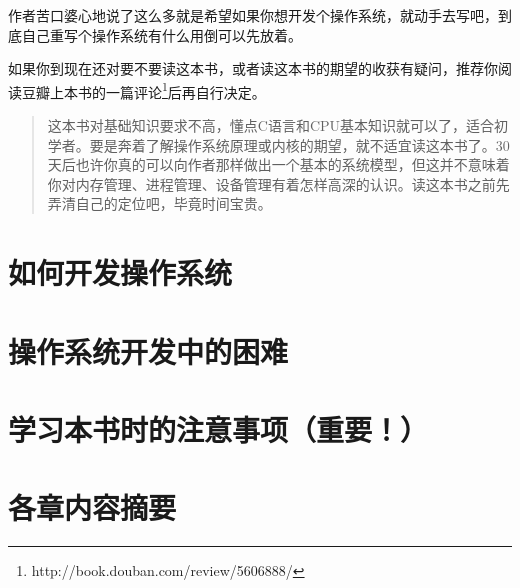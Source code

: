 作者苦口婆心地说了这么多就是希望如果你想开发个操作系统，就动手去写吧，到底自己重写个操作系统有什么用倒可以先放着。

如果你到现在还对要不要读这本书，或者读这本书的期望的收获有疑问，推荐你阅读豆瓣上本书的一篇评论\footnote{ http://book.douban.com/review/5606888/ }后再自行决定。
\begin{quote}
这本书对基础知识要求不高，懂点C语言和CPU基本知识就可以了，适合初学者。要是奔着了解操作系统原理或内核的期望，就不适宜读这本书了。30天后也许你真的可以向作者那样做出一个基本的系统模型，但这并不意味着你对内存管理、进程管理、设备管理有着怎样高深的认识。读这本书之前先弄清自己的定位吧，毕竟时间宝贵。
\end{quote}

\section{	如何开发操作系统	}
\section{	操作系统开发中的困难	}
\section{	学习本书时的注意事项（重要！）	}
\section{	各章内容摘要	}

